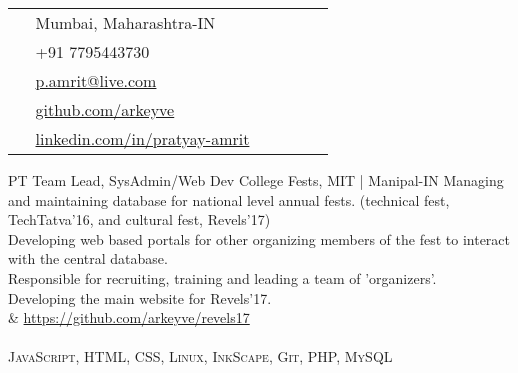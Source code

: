 \documentclass[10pt]{article} %
\begin{document}
\begin{paracol}{2}
\parbox[top][0.12\textheight][c]{\linewidth}{ %
	\vspace{-0.04\textheight} %
	\colorbox{shade}{ %
		\begin{supertabular}{p{0.05\linewidth}|p{0.775\linewidth}} %
			\raisebox{-1pt}{\faHome} & Mumbai, Maharashtra-IN \\ %
			\raisebox{-1pt}{\faPhone} & +91 7795443730 \\ %
			\raisebox{0pt}{\small\faEnvelope} & \href{mailto:p.amrit@live.com}{p.amrit@live.com} \\ %
			\raisebox{-1pt}{\faGithub} & \href{https://github.com/arkeyve}{github.com/arkeyve} \\ %
			\raisebox{-1pt}{\faLinkedinSquare} & \href{https://www.linkedin.com/in/pratyay-amrit}{linkedin.com/in/pratyay-amrit} \\ %
		\end{supertabular}
	}
}

\medskip
\medskip
\medskip

{PT} %
{Team Lead, SysAdmin/Web Dev} %
{College Fests, MIT | Manipal-IN} %
{
\raisebox{-0.5pt}{\faAngleRight} Managing and maintaining database for national level annual fests. (technical fest, TechTatva’16, and cultural fest, Revels’17)\\
\raisebox{-0.5pt}{\faAngleRight} Developing web based portals for other organizing members of the fest to interact with the central database.\\
\raisebox{-0.5pt}{\faAngleRight} Responsible for recruiting, training and leading a team of 'organizers'.\\
\raisebox{-0.5pt}{\faAngleRight} Developing the main website for Revels’17.\\
\raisebox{-1pt}{\faGithub} & \href{https://github.com/arkeyve/revels17}{https://github.com/arkeyve/revels17}\\
\\
\textbf{\faCode} \textsc{JavaScript, HTML, CSS, Linux, InkScape, Git, PHP, MySQL}
} %


\end{paracol}
\end{document}
